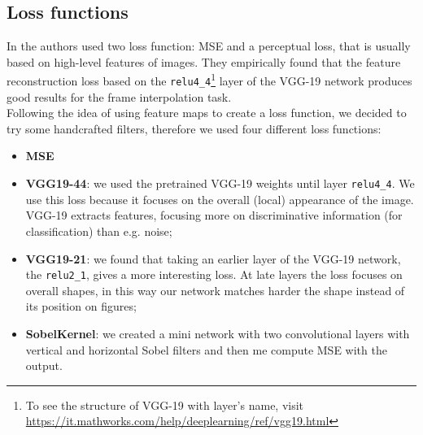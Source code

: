 \documentclass[11pt, a4paper]{article}
\begin{document}
	\subsection{Loss functions}
	In \cite{mainpaper} the authors used two loss function: MSE and a perceptual loss, that is usually based on high-level features of images. They empirically found that the feature reconstruction loss based on the \texttt{relu4\_4}\footnote{\label{vgg-structure}To see the structure of VGG-19 with layer's name, visit \url{https://it.mathworks.com/help/deeplearning/ref/vgg19.html}} layer of the VGG-19 network produces good results for the frame interpolation task.\\
	Following the idea of using feature maps to create a loss function, we decided to try some handcrafted filters, therefore we used four different loss functions:
	\begin{itemize}
		\item \textbf{MSE}
		\item \textbf{VGG19-44}: we used the pretrained VGG-19 weights until layer \texttt{relu4\_4}. We use this loss because it focuses on the overall (local) appearance of the image. VGG-19 extracts features, focusing more on discriminative information (for classification) than e.g. noise;
		\item \textbf{VGG19-21}: we found that taking an earlier layer of the VGG-19 network, the \texttt{relu2\_1}, gives a more interesting loss. At late layers the loss focuses on overall shapes, in this way our network matches harder the shape instead of its position on figures;
		\item \textbf{SobelKernel}: we created a mini network with two convolutional layers with vertical and horizontal Sobel filters and then me compute MSE with the output.
	\end{itemize}
\end{document}
